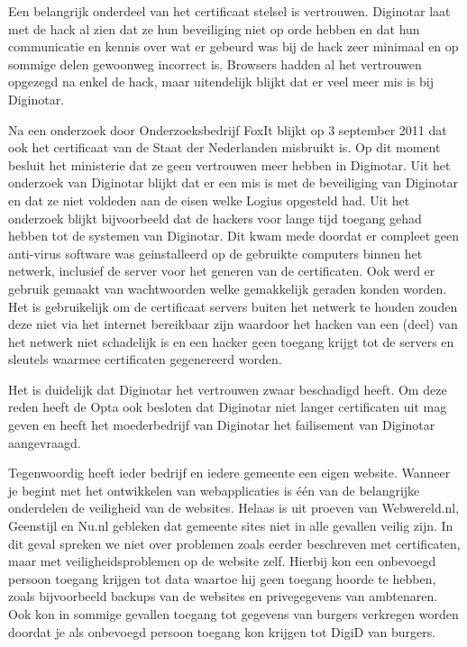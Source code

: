 Een belangrijk onderdeel van het certificaat stelsel is vertrouwen. Diginotar laat met de hack al zien dat ze hun beveiliging niet op orde hebben en dat hun communicatie en kennis over wat er gebeurd was bij de hack zeer minimaal en op sommige delen gewoonweg incorrect is. Browsers hadden al het vertrouwen opgezegd na enkel de hack, maar uitendelijk blijkt dat er veel meer mis is bij Diginotar. 

Na een onderzoek door Onderzoeksbedrijf FoxIt blijkt op 3 september 2011 dat ook het certificaat van de Staat der Nederlanden misbruikt is\cite{bib.foxit}. Op dit moment besluit het ministerie dat ze geen vertrouwen meer hebben in Diginotar\cite{bib.webwereld.diginotar4}. Uit het onderzoek van Diginotar blijkt dat er een mis is met de beveiliging van Diginotar en dat ze niet voldeden aan de eisen welke Logius opgesteld had. Uit het onderzoek blijkt bijvoorbeeld dat de hackers voor lange tijd toegang gehad hebben tot de systemen van Diginotar. Dit kwam mede doordat er compleet geen anti-virus software was geinstalleerd op de gebruikte computers binnen het netwerk, inclusief de server voor het generen van de certificaten. Ook werd er gebruik gemaakt van wachtwoorden welke gemakkelijk geraden konden worden. 
Het is gebruikelijk om de certificaat servers buiten het netwerk te houden zouden deze niet via het internet bereikbaar zijn waardoor het hacken van een (deel) van het netwerk niet schadelijk is en een hacker geen toegang krijgt tot de servers en sleutels waarmee certificaten gegenereerd worden.

Het is duidelijk dat Diginotar het vertrouwen zwaar beschadigd heeft. Om deze reden heeft de Opta ook besloten dat Diginotar niet langer certificaten uit mag geven en heeft het moederbedrijf van Diginotar het failisement van Diginotar aangevraagd.

Tegenwoordig heeft ieder bedrijf en iedere gemeente een eigen website. Wanneer je begint met het ontwikkelen van webapplicaties is \'{e}\'{e}n van de belangrijke onderdelen de veiligheid van de websites. Helaas is uit proeven van Webwereld.nl, Geenstijl en Nu.nl gebleken dat gemeente sites niet in alle gevallen veilig zijn\cite{bib.tweakers.gemeente}. In dit geval spreken we niet over problemen zoals eerder beschreven met certificaten, maar met veiligheidsproblemen op de website zelf. Hierbij kon een onbevoegd persoon toegang krijgen tot data waartoe hij geen toegang hoorde te hebben, zoals bijvoorbeeld backups van de websites en privegegevens van ambtenaren. Ook kon in sommige gevallen toegang tot gegevens van burgers verkregen worden doordat je als onbevoegd persoon toegang kon krijgen tot DigiD van burgers. 

